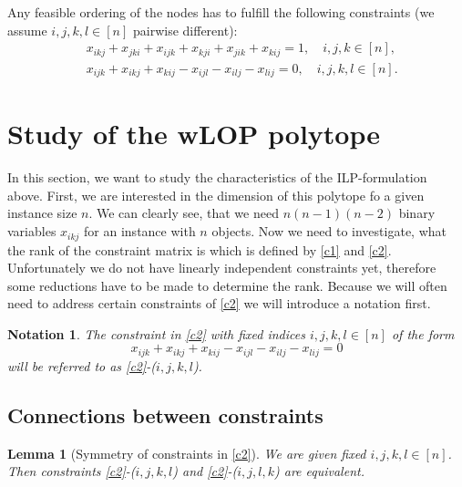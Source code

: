 \documentclass{scrartcl}
\newtheorem{notation}{Notation}
\newtheorem{lemma}{Lemma}
\theoremstyle{plain}
\begin{document}
Any feasible ordering of the nodes has to fulfill the following constraints (we assume $i,j,k,l \in [n]$ pairwise different):
\begin{align}
&x_{ikj} + x_{jki} + x_{ijk} + x_{kji} + x_{jik} + x_{kij} = 1, \quad i, j, k \in [n], \label{c1}\\ 
&x_{ijk} + x_{ikj} + x_{kij} - x_{ijl} - x_{ilj} - x_{lij} = 0, \quad i, j, k, l \in [n].\label{c2}
\end{align}

\newpage

\section{Study of the wLOP polytope}

In this section, we want to study the characteristics of the ILP-formulation above. First, we are interested in the dimension of this polytope fo a given instance size $n$. We can clearly see, that we need $n(n-1)(n-2)$ binary variables $x_{ikj}$ for an instance with $n$ objects. Now we need to investigate, what the rank of the constraint matrix is which is defined by \eqref{c1} and \eqref{c2}. Unfortunately we do not have linearly independent constraints yet, therefore some reductions have to be made to determine the rank. Because we will often need to address certain constraints of \eqref{c2} we will introduce a notation first.

\begin{mdframed}
	\begin{notation}\label{not}
		The constraint in \eqref{c2} with fixed indices $i,j,k,l \in [n]$ of the form
		\begin{equation*}
		x_{ijk} + x_{ikj} + x_{kij} - x_{ijl} - x_{ilj} - x_{lij} = 0
		\end{equation*}
		will be referred to as \eqref{c2}-($i,j,k,l$).
	\end{notation}
	\vspace{7pt}
\end{mdframed}

\subsection{Connections between constraints}

\begin{mdframed}
	\begin{lemma}[Symmetry of constraints in \eqref{c2}]\label{sym}
		We are given fixed $i,j,k,l \in [n]$. Then constraints \eqref{c2}-($i,j,k,l$) and \eqref{c2}-($i,j,l,k$) are equivalent.
	\end{lemma}
	\vspace{7pt}
\end{mdframed}
\end{document}
